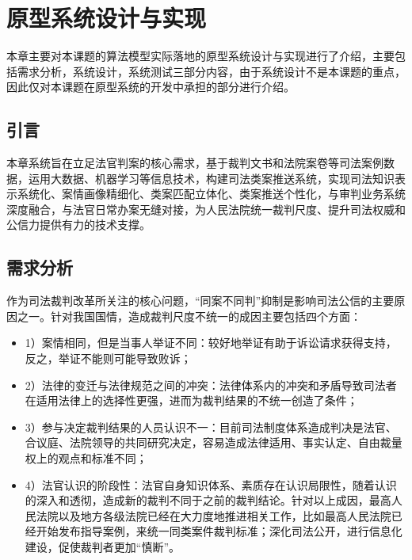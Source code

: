 
\chapter{原型系统设计与实现}
本章主要对本课题的算法模型实际落地的原型系统设计与实现进行了介绍，主要包括需求分析，系统设计，系统测试三部分内容，由于系统设计不是本课题的重点，因此仅对本课题在原型系统的开发中承担的部分进行介绍。

\section{引言}
\label{sec:sys_intro}
本章系统旨在立足法官判案的核心需求，基于裁判文书和法院案卷等司法案例数据，运用大数据、机器学习等信息技术，构建司法类案推送系统，实现司法知识表示系统化、案情画像精细化、类案匹配立体化、类案推送个性化，与审判业务系统深度融合，与法官日常办案无缝对接，为人民法院统一裁判尺度、提升司法权威和公信力提供有力的技术支撑。
\section{需求分析}

作为司法裁判改革所关注的核心问题，“同案不同判”抑制是影响司法公信的主要原因之一。针对我国国情，造成裁判尺度不统一的成因主要包括四个方面：
\begin{itemize}
    \item 1）案情相同，但是当事人举证不同：较好地举证有助于诉讼请求获得支持，反之，举证不能则可能导致败诉；
    \item 2）法律的变迁与法律规范之间的冲突：法律体系内的冲突和矛盾导致司法者在适用法律上的选择性更强，进而为裁判结果的不统一创造了条件；
    \item 3）参与决定裁判结果的人员认识不一：目前司法制度体系造成判决是法官、合议庭、法院领导的共同研究决定，容易造成法律适用、事实认定、自由裁量权上的观点和标准不同；
    \item 4）法官认识的阶段性：法官自身知识体系、素质存在认识局限性，随着认识的深入和透彻，造成新的裁判不同于之前的裁判结论。针对以上成因，最高人民法院以及地方各级法院已经在大力度地推进相关工作，比如最高人民法院已经开始发布指导案例，来统一同类案件裁判标准；深化司法公开，进行信息化建设，促使裁判者更加“慎断”。
\end{itemize}

